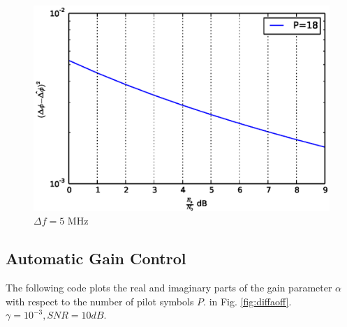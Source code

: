 \documentclass[journal,12pt,twocolumn]{IEEEtran}
\begin{document}
\begin{figure}[!hb]
\begin{center}
\includegraphics[width=\columnwidth]{./figs/Phase_error_with_respect_to_SNR_fixed_pilot.eps}
\end{center}
\caption{$\Delta f = 5$ MHz}
\label{fig:phaseerrorsnr}
\end{figure}
%
\subsection{Automatic Gain Control}
%

%
The following code plots the real and imaginary parts of the gain parameter $\alpha$ with respect to the number of pilot symbols $P$.
in Fig. \ref{fig:diffaoff}.  $\gamma = 10^{-3}, SNR=10 dB$.
\end{document}
